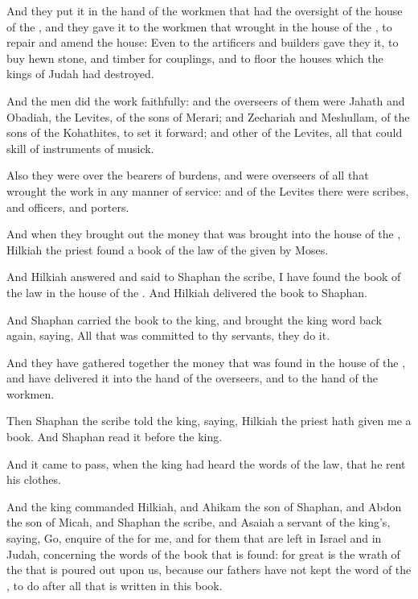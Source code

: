 \verse And they put it in the hand of the workmen that had the oversight of the house of the \LORD, and they gave it to the workmen that wrought in the house of the \LORD, to repair and amend the house: \verse Even to the artificers and builders gave they it, to buy hewn stone, and timber for couplings, and to floor the houses which the kings of Judah had destroyed.

\verse And the men did the work faithfully: and the overseers of them were Jahath and Obadiah, the Levites, of the sons of Merari; and Zechariah and Meshullam, of the sons of the Kohathites, to set it forward; and other of the Levites, all that could skill of instruments of musick.

\verse Also they were over the bearers of burdens, and were overseers of all that wrought the work in any manner of service: and of the Levites there were scribes, and officers, and porters.

\verse And when they brought out the money that was brought into the house of the \LORD, Hilkiah the priest found a book of the law of the \LORD given by Moses.

\verse And Hilkiah answered and said to Shaphan the scribe, I have found the book of the law in the house of the \LORD. And Hilkiah delivered the book to Shaphan.

\verse And Shaphan carried the book to the king, and brought the king word back again, saying, All that was committed to thy servants, they do it.

\verse And they have gathered together the money that was found in the house of the \LORD, and have delivered it into the hand of the overseers, and to the hand of the workmen.

\verse Then Shaphan the scribe told the king, saying, Hilkiah the priest hath given me a book. And Shaphan read it before the king.

\verse And it came to pass, when the king had heard the words of the law, that he rent his clothes.

\verse And the king commanded Hilkiah, and Ahikam the son of Shaphan, and Abdon the son of Micah, and Shaphan the scribe, and Asaiah a servant of the king's, saying, \verse Go, enquire of the \LORD for me, and for them that are left in Israel and in Judah, concerning the words of the book that is found: for great is the wrath of the \LORD that is poured out upon us, because our fathers have not kept the word of the \LORD, to do after all that is written in this book.

